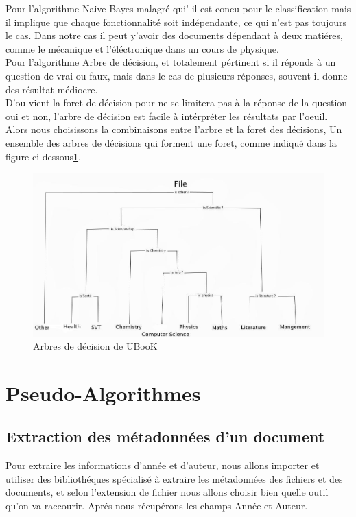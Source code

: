 \documentclass[12pt]{report}
\begin{document}
Pour l'algorithme Naive Bayes malagré qui' il est concu pour le classification mais il implique que chaque fonctionnalité soit indépendante, ce qui n’est pas toujours le cas. Dans notre cas il peut y'avoir des documents dépendant à deux matiéres, comme le mécanique et l'éléctronique dans un cours de physique. \\

Pour l'algorithme Arbre de décision, et totalement pértinent si il réponds à un question de vrai ou faux, mais dans le cas de plusieurs réponses, souvent il donne des résultat médiocre. \\ 
D'ou vient la foret de décision pour ne se limitera pas à la réponse de la question oui et non, 
l'arbre de décision est facile à intérpréter les résultats par l'oeuil.\\

Alors nous choisissons la combinaisons entre l'arbre et la foret des décisions, Un ensemble des arbres de décisions qui forment une foret, comme indiqué dans la figure ci-dessous\ref{aaa : aaa}.


\begin{figure}[!hbtp]
    \centering
    \includegraphics[width=.8\textwidth]{classification Trees}
    \caption{Arbres de décision de UBooK }
    \label{aaa : aaa}
\end{figure}



\section{Pseudo-Algorithmes}

\subsection{Extraction des métadonnées d'un document}

Pour extraire les informations d'année et d'auteur, nous allons importer et utiliser des bibliothéques spécialisé à extraire les métadonnées des fichiers et des documents, et selon l'extension de fichier nous allons choisir bien quelle outil qu'on va raccourir. 
Aprés nous récupérons les champs Année et Auteur. 
\end{document}
